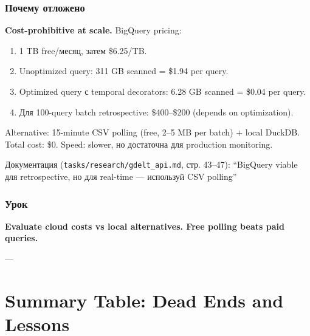 \subsubsection*{Почему отложено}
\textbf{Cost-prohibitive at scale.} BigQuery pricing:
\begin{enumerate}
\item 1 TB free/месяц, затем \$6.25/TB.
\item Unoptimized query: 311 GB scanned = \$1.94 per query.
\item Optimized query с temporal decorators: 6.28 GB scanned = \$0.04 per query.
\item Для 100-query batch retrospective: \$400--\$200 (depends on optimization).
\end{enumerate}

Alternative: 15-minute CSV polling (free, 2--5 MB per batch) + local DuckDB. Total cost: \$0. Speed: slower, но достаточна для production monitoring.

Документация (\texttt{tasks/research/gdelt\_api.md}, стр. 43--47): ``BigQuery viable для retrospective, но для real-time --- используй CSV polling''

\subsubsection*{Урок}
\textbf{Evaluate cloud costs vs local alternatives. Free polling beats paid queries.}

---

\section*{Summary Table: Dead Ends and Lessons}


